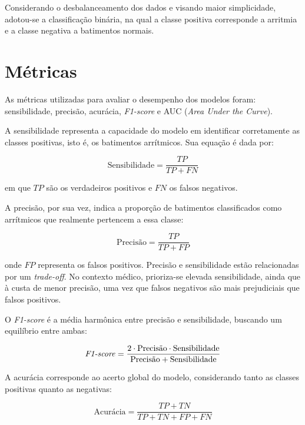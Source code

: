 \documentclass[
    12pt,                %
    openright,           %
    oneside,             %
    a4paper,             %
    brazil               %
]{abntex2}
\begin{document}
Considerando o desbalanceamento dos dados e visando maior simplicidade, adotou-se a classificação binária, na qual a classe positiva corresponde a arritmia e a classe negativa a batimentos normais.

\section{Métricas}
\label{sec:metricas}

As métricas utilizadas para avaliar o desempenho dos modelos foram: sensibilidade, precisão, acurácia, \textit{F1-score} e AUC (\textit{Area Under the Curve}).  

A sensibilidade representa a capacidade do modelo em identificar corretamente as classes positivas, isto é, os batimentos arrítmicos. Sua equação é dada por:

\begin{equation}
\text{Sensibilidade} = \frac{TP}{TP + FN}
\end{equation}

em que $TP$ são os verdadeiros positivos e $FN$ os falsos negativos.  

A precisão, por sua vez, indica a proporção de batimentos classificados como arrítmicos que realmente pertencem a essa classe:

\begin{equation}
\text{Precisão} = \frac{TP}{TP + FP}
\end{equation}

onde $FP$ representa os falsos positivos. Precisão e sensibilidade estão relacionadas por um \textit{trade-off}. No contexto médico, prioriza-se elevada sensibilidade, ainda que à custa de menor precisão, uma vez que falsos negativos são mais prejudiciais que falsos positivos.  

O \textit{F1-score} é a média harmônica entre precisão e sensibilidade, buscando um equilíbrio entre ambas:

\begin{equation}
\text{\textit{F1-score}} = \frac{2 \cdot \text{Precisão} \cdot \text{Sensibilidade}}{\text{Precisão} + \text{Sensibilidade}}
\end{equation}

A acurácia corresponde ao acerto global do modelo, considerando tanto as classes positivas quanto as negativas:

\begin{equation}
\text{Acurácia} = \frac{TP + TN}{TP + TN + FP + FN}
\end{equation}
\end{document}
